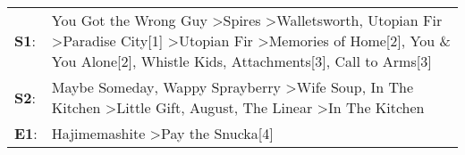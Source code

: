 \begin{supertabular}{p{0.03\textwidth}p{0.92\textwidth}}
 \textbf{S1}:  &  You Got the Wrong Guy\textsuperscript{} \textgreater \enspace Spires\textsuperscript{} \textgreater \enspace Walletsworth\textsuperscript{}, \enspace Utopian Fir\textsuperscript{} \textgreater \enspace Paradise City[1]\textsuperscript{} \textgreater \enspace Utopian Fir\textsuperscript{} \textgreater \enspace Memories of Home[2]\textsuperscript{}, \enspace You \& You Alone[2]\textsuperscript{}, \enspace Whistle Kids\textsuperscript{}, \enspace Attachments[3]\textsuperscript{}, \enspace Call to Arms[3]\textsuperscript{}  \enspace  \\
 \textbf{S2}:  &                                                                                                                                                                                Maybe Someday\textsuperscript{}, \enspace Wappy Sprayberry\textsuperscript{} \textgreater \enspace Wife Soup\textsuperscript{}, \enspace In The Kitchen\textsuperscript{} \textgreater \enspace Little Gift\textsuperscript{}, \enspace August\textsuperscript{}, \enspace The Linear\textsuperscript{} \textgreater \enspace In The Kitchen\textsuperscript{}  \enspace  \\
 \textbf{E1}:  &                                                                                                                                                                                                                                                                                                                                                                                                                                                     Hajimemashite\textsuperscript{} \textgreater \enspace Pay the Snucka[4]\textsuperscript{}  \enspace  \\
\end{supertabular}

